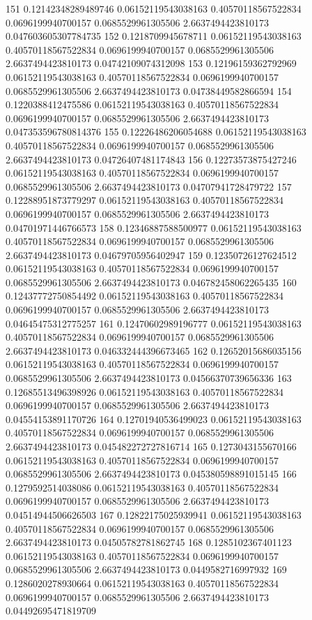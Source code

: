 {151 0.12142348289489746 0.06152119543038163 0.40570118567522834 0.0696199940700157 0.0685529961305506 2.6637494423810173 0.047603605307784735
152 0.1218709945678711 0.06152119543038163 0.40570118567522834 0.0696199940700157 0.0685529961305506 2.6637494423810173 0.04742109074312098
153 0.12196159362792969 0.06152119543038163 0.40570118567522834 0.0696199940700157 0.0685529961305506 2.6637494423810173 0.04738449582866594
154 0.1220388412475586 0.06152119543038163 0.40570118567522834 0.0696199940700157 0.0685529961305506 2.6637494423810173 0.047353596780814376
155 0.12226486206054688 0.06152119543038163 0.40570118567522834 0.0696199940700157 0.0685529961305506 2.6637494423810173 0.04726407481174843
156 0.12273573875427246 0.06152119543038163 0.40570118567522834 0.0696199940700157 0.0685529961305506 2.6637494423810173 0.04707941728479722
157 0.12288951873779297 0.06152119543038163 0.40570118567522834 0.0696199940700157 0.0685529961305506 2.6637494423810173 0.04701971446766573
158 0.12346887588500977 0.06152119543038163 0.40570118567522834 0.0696199940700157 0.0685529961305506 2.6637494423810173 0.04679705956402947
159 0.12350726127624512 0.06152119543038163 0.40570118567522834 0.0696199940700157 0.0685529961305506 2.6637494423810173 0.046782458062265435
160 0.12437772750854492 0.06152119543038163 0.40570118567522834 0.0696199940700157 0.0685529961305506 2.6637494423810173 0.04645475312775257
161 0.12470602989196777 0.06152119543038163 0.40570118567522834 0.0696199940700157 0.0685529961305506 2.6637494423810173 0.046332444396673465
162 0.12652015686035156 0.06152119543038163 0.40570118567522834 0.0696199940700157 0.0685529961305506 2.6637494423810173 0.04566370739656336
163 0.12685513496398926 0.06152119543038163 0.40570118567522834 0.0696199940700157 0.0685529961305506 2.6637494423810173 0.04554153891170726
164 0.12701940536499023 0.06152119543038163 0.40570118567522834 0.0696199940700157 0.0685529961305506 2.6637494423810173 0.045482272727816714
165 0.1273043155670166 0.06152119543038163 0.40570118567522834 0.0696199940700157 0.0685529961305506 2.6637494423810173 0.045380598891015145
166 0.1279592514038086 0.06152119543038163 0.40570118567522834 0.0696199940700157 0.0685529961305506 2.6637494423810173 0.04514944506626503
167 0.12822175025939941 0.06152119543038163 0.40570118567522834 0.0696199940700157 0.0685529961305506 2.6637494423810173 0.04505782781862745
168 0.1285102367401123 0.06152119543038163 0.40570118567522834 0.0696199940700157 0.0685529961305506 2.6637494423810173 0.0449582716997932
169 0.1286020278930664 0.06152119543038163 0.40570118567522834 0.0696199940700157 0.0685529961305506 2.6637494423810173 0.04492695471819709
}
